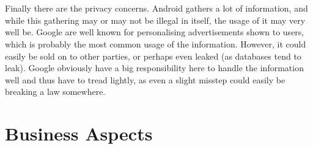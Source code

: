 \documentclass[conference]{IEEEtran}
\begin{document}
\\\\Finally there are the privacy concerns. Android gathers a lot of information, and while this gathering may or may not be illegal in itself, the usage of it may very well be. Google are well known for personalising advertisements shown to users, which is probably the most common usage of the information. However, it could easily be sold on to other parties, or perhaps even leaked (as databases tend to leak). Google obviously have a big responsibility here to handle the information well and thus have to tread lightly, as even a slight misstep could easily be breaking a law somewhere. 


\section{Business Aspects}
\label{financial}
\end{document}
